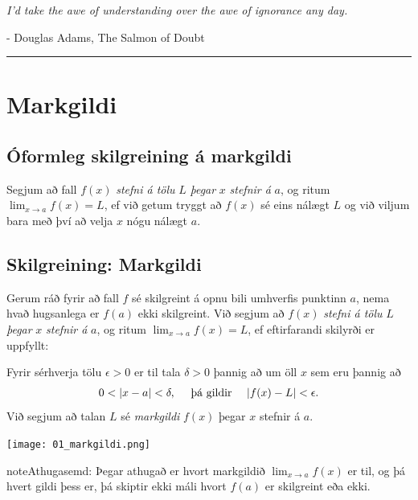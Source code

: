 \documentclass[a4paper,10pt,icelandic]{sphinxmanual}
\begin{document}
\emph{I'd take the awe of understanding over the awe of ignorance any day.}

- Douglas Adams, The Salmon of Doubt


\bigskip\hrule{}\bigskip



\section{Markgildi}
\label{kafli02:id1}\label{kafli02:markgildi}

\subsection{Óformleg skilgreining á markgildi}
\label{kafli02:index-0}\label{kafli02:oformleg-skilgreining-a-markgildi}
Segjum að fall \(f(x)\) \emph{stefni á tölu} \(L\) \emph{þegar} \(x\)
\emph{stefnir á} \(a\), og ritum \(\lim_{x\rightarrow a} f(x)=L\), ef
við getum tryggt að \(f(x)\) sé eins nálægt \(L\) og við
viljum bara með því að velja \(x\) nógu nálægt \(a\).


\subsection{Skilgreining: Markgildi}
\label{kafli02:skilgreining-markgildi}
Gerum ráð fyrir að fall \(f\) sé skilgreint á opnu bili umhverfis
punktinn \(a\), nema hvað hugsanlega er \(f(a)\) ekki
skilgreint. Við segjum að \(f(x)\) \emph{stefni á tölu} \(L\) \emph{þegar}
\(x\) \emph{stefnir á} \(a\), og ritum
\(\lim_{x\rightarrow a} f(x)=L\), ef eftirfarandi skilyrði er
uppfyllt:

Fyrir sérhverja tölu \(\epsilon>0\) er til tala \(\delta>0\)
þannig að um öll \(x\) sem eru þannig að
\begin{gather}
\begin{split}0 < |x-a| < \delta,\quad \text{ þá gildir } \quad |f(x)-L| <\epsilon.\end{split}\notag
\end{gather}
Við segjum að talan \(L\) sé \textit{markgildi} \(f(x)\) þegar
\(x\) stefnir á \(a\).


\begin{center}
\texttt{[image: 01\_markgildi.png]}
\end{center}


\begin{notice}{note}{Athugasemd:}
Þegar athugað er hvort markgildið \(\lim_{x\rightarrow a} f(x)\) er
til, og þá hvert gildi þess er, þá skiptir ekki máli hvort \(f(a)\) er
skilgreint eða ekki.
\end{notice}
\end{document}
